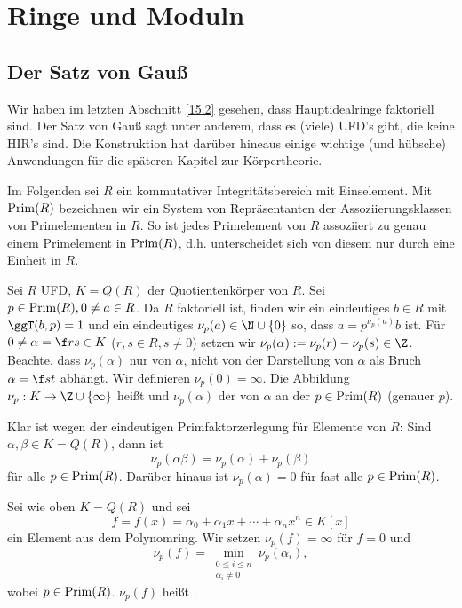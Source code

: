 \chapter{Ringe und Moduln}


\setcounter{section}{2}
\section{Der Satz von Gauß}

Wir haben im letzten Abschnitt \ref{15.2} gesehen, dass Hauptidealringe faktoriell sind.
Der Satz von Gauß sagt unter anderem, dass es (viele) UFD's gibt, die keine HIR's sind.
Die Konstruktion hat darüber hineaus einige wichtige (und hübsche) Anwendungen für die späteren Kapitel zur Körpertheorie.

Im Folgenden sei $R$ ein kommutativer Integritätsbereich mit Einselement.
Mit $\operatorname{Prim}(R)$ bezeichnen wir ein System von Repräsentanten der Assoziierungsklassen von Primelementen in $R$.
So ist jedes Primelement von $R$ assoziiert zu genau einem Primelement in $\operatorname{Prim}(R)$, d.h. unterscheidet sich von diesem nur durch eine Einheit in $R$.

\begin{df} \label{15.3-1}
	Sei $R$ UFD, $K = Q(R)$ der Quotientenkörper von $R$.
	Sei $p \in \operatorname{Prim}(R), 0 \neq a \in R$.
	Da $R$ faktoriell ist, finden wir ein eindeutiges $b \in R$ mit $\ggT(b,p) = 1$ und ein eindeutiges $\nu_p(a) \in \N \cup \{0\}$ so, dass $a = p^{\nu_p(a)} b$ ist.
	Für $0 \neq \alpha = \f rs \in K$ ($r, s \in R, s \neq 0$) setzen wir $\nu_p(\alpha) := \nu_p(r) - \nu_p(s) \in \Z$.
	Beachte, dass $\nu_p(\alpha)$ nur von $\alpha$, nicht von der Darstellung von $\alpha$ als Bruch $\alpha = \f st$ abhängt.
	Wir definieren $\nu_p(0) = \infty$.
	Die Abbildung $\nu_p: K \to \Z \cup \{\infty\}$ heißt  und $\nu_p(\alpha)$ der  von $\alpha$ an der  $p\in \operatorname{Prim}(R)$ (genauer  $p$).

	Klar ist wegen der eindeutigen Primfaktorzerlegung für Elemente von $R$:
	Sind $\alpha, \beta \in K = Q(R)$, dann ist
	\[
		\nu_p(\alpha \beta) = \nu_p(\alpha) + \nu_p(\beta)
	\]
	für alle $p \in \operatorname{Prim}(R)$.
	Darüber hinaus ist $\nu_p(\alpha) = 0$ für fast alle $p \in \operatorname{Prim}(R)$.
\end{df}

\begin{df} \label{15.3-2}
	Sei wie oben $K = Q(R)$ und sei
	\[
		f = f(x) = \alpha_0 + \alpha_1 x + \dotsb + \alpha_n x^n \in K[x]
	\]
	ein Element aus dem Polynomring.
	Wir setzen $\nu_p(f) = \infty$ für $f = 0$ und
	\[
		\nu_p(f) = \min_{\substack{0\le i \le n \\ \alpha_i \neq 0}} \nu_p(\alpha_i),
	\]
	wobei $p \in \operatorname{Prim}(R)$.
	$\nu_p(f)$ heißt .
\end{df}


